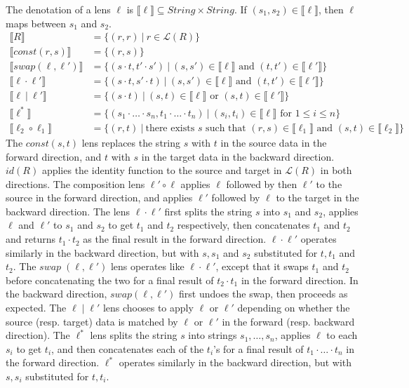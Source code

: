 \documentclass[acmsmall,review,anonymous]{acmart}
\newcommand{\sep}{\ensuremath{\ | \ }}
\begin{document}
The denotation of a lens $\ell$ is $\llbracket \ell \rrbracket \subseteq
\mathit{String} \times \mathit{String}$. If $(s_1, s_2) \in \llbracket \ell
\rrbracket$, then $\ell$ maps between $s_1$ and $s_2$.
\begin{align*}
\llbracket R \rrbracket &= \{(r, r) \sep r \in \mathcal{L}(R)\}\\
\llbracket const(r, s) \rrbracket &= \{(r, s)\}\\
\llbracket swap(\ell, \ell') \rrbracket &= \{(s \cdot t, t' \cdot s') \sep
(s, s') \in \llbracket \ell \rrbracket \text{ and } (t, t') \in \llbracket
\ell' \rrbracket\}\\
\llbracket \ell \cdot \ell' \rrbracket &= \{(s \cdot t, s' \cdot t) \sep
(s, s') \in \llbracket \ell \rrbracket \text{ and } (t, t') \in \llbracket
\ell' \rrbracket\}\\
\llbracket \ell \sep \ell' \rrbracket &= \{(s \cdot t) \sep
(s, t) \in \llbracket \ell \rrbracket \text{ or } (s, t) \in \llbracket
\ell' \rrbracket\}\\
\llbracket \ell^* \rrbracket &= \{(s_1 \cdot \ldots \cdot s_n, t_1 \cdot \ldots
\cdot t_n) \sep (s_i, t_i) \in \llbracket \ell \rrbracket \text{ for } 1
\leq i \leq n\}\\
\llbracket \ell_2 \circ \ell_1 \rrbracket &= \{(r, t) \sep \text{there exists }s
\text{ such that } (r, s) \in \llbracket \ell_1 \rrbracket \text{ and } (s, t)
\in \llbracket \ell_2 \rrbracket\}
\end{align*}
The $\mathit{const}(s, t)$ lens replaces the string $s$ with $t$ in the source
data in the forward direction, and $t$ with $s$ in the target data in the backward
direction. $\mathit{id}(R)$ applies the identity function to the source and target
in $\mathcal{L}(R)$ in both directions. The composition lens $\ell' \circ \ell$
applies $\ell$ followed by then $\ell'$ to the source in the forward direction,
and applies $\ell'$ followed by $\ell$ to the target in the backward direction.
The lens $\ell \cdot \ell'$ first splits the string $s$ into $s_1$ and $s_2$,
applies $\ell$ and $\ell'$ to $s_1$ and $s_2$ to get $t_1$ and $t_2$
respectively, then concatenates $t_1$ and $t_2$ and returns $t_1 \cdot t_2$ as
the final result in the forward direction. $\ell \cdot \ell'$ operates
similarly in the backward direction, but with $s, s_1$ and $s_2$ substituted
for $t, t_1$ and $t_2$. The $\mathit{swap} \; (\ell, \ell')$ lens operates
like $\ell \cdot \ell'$, except that it swaps $t_1$ and $t_2$ before
concatenating the two for a final result of $t_2 \cdot t_1$ in the forward
direction. In the backward direction, $\mathit{swap}(\ell, \ell')$ first undoes
the swap, then proceeds as expected. The $\ell \; | \; \ell'$ lens
chooses to apply $\ell$ or $\ell'$ depending on whether the source
(resp. target) data is matched by $\ell$ or $\ell'$ in the forward (resp.
backward direction). The $\ell^*$ lens splits the string $s$ into strings $s_1,
\ldots, s_n$, applies $\ell$ to each $s_i$ to get $t_i$, and then concatenates
each of the $t_i$'s for a final result of $t_1 \cdot \ldots \cdot t_n$ in the
forward direction. $\ell^*$ operates similarly in the backward direction, but
with $s, s_i$ substituted for $t, t_i$.
\end{document}

